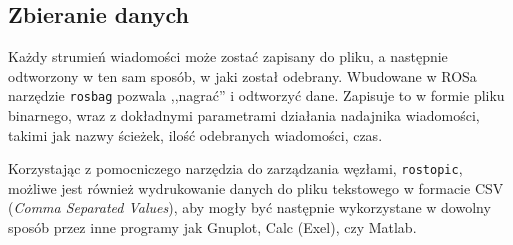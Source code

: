 	\subsection{Zbieranie danych}
		Każdy strumień wiadomości może zostać zapisany do pliku, a następnie odtworzony w ten sam sposób, w jaki został odebrany.
		Wbudowane w ROSa narzędzie \texttt{rosbag} pozwala ,,nagrać'' i odtworzyć dane.
		Zapisuje to w formie pliku binarnego, wraz z dokładnymi parametrami działania nadajnika wiadomości, takimi jak nazwy ścieżek, ilość odebranych wiadomości, czas.
		
		Korzystając z pomocniczego narzędzia do zarządzania węzłami, \texttt{rostopic},
		możliwe jest również wydrukowanie danych do pliku tekstowego w formacie CSV (\emph{Comma Separated Values}),
		aby mogły być następnie wykorzystane w dowolny sposób przez inne programy jak Gnuplot, Calc (Exel), czy Matlab.
		
	
	
	
	
	

